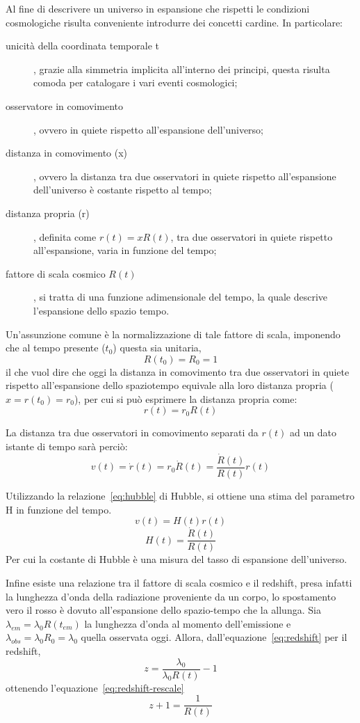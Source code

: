 Al fine di descrivere un universo in espansione che rispetti le condizioni cosmologiche risulta conveniente introdurre dei concetti cardine. In particolare:
\begin{description}
    \item[unicità della coordinata temporale t], grazie alla simmetria implicita all'interno dei principi, questa risulta comoda per catalogare i vari eventi cosmologici;
    \item[osservatore in comovimento], ovvero in quiete rispetto all'espansione dell'universo;
    \item[distanza in comovimento (x)], ovvero la distanza tra due osservatori in quiete rispetto all'espansione dell'universo è costante rispetto al tempo;
    \item[distanza propria (r)], definita come $r(t) = x R(t)$, tra due osservatori in quiete rispetto all'espansione, varia in funzione del tempo;
    \item[fattore di scala cosmico $R(t)$], si tratta di una funzione adimensionale del tempo, la quale descrive l'espansione dello spazio tempo.
\end{description}

Un'assunzione comune è la normalizzazione di tale fattore di scala, imponendo che al tempo presente ($t_0$) questa sia unitaria,
\[
    R(t_0) = R_0 = 1
\]
il che vuol dire che oggi la distanza in comovimento tra due osservatori in quiete rispetto all'espansione dello spaziotempo equivale alla loro distanza propria ($x = r(t_0) = r_0$), per cui si può esprimere la distanza propria come:
\[
    r(t)= r_0 R(t)
\]

La distanza tra due osservatori in comovimento separati da $r(t)$ ad un dato istante di tempo sarà perciò:
\begin{equation}\label{eq:hubble-speed}
    v(t) = \dot{r}(t) = r_0 \dot{R}(t) = \frac{\dot{R}(t)}{R(t)}r(t)
\end{equation}

Utilizzando la relazione~\ref{eq:hubble} di Hubble, si ottiene una stima del parametro H in funzione del tempo.
\[
    v(t) = H(t)r(t)
\]
\begin{equation}\label{eq:hubble-scale}
    H(t) = \frac{\dot{R}(t)}{R(t)}
\end{equation}
Per cui la costante di Hubble è una misura del tasso di espansione dell'universo.

Infine esiste una relazione tra il fattore di scala cosmico e il redshift, presa infatti la lunghezza d'onda della radiazione proveniente da un corpo, lo spostamento vero il rosso è dovuto all'espansione dello spazio-tempo che la allunga. Sia $\lambda_{em} = \lambda_0 R(t_{em})$ la lunghezza d'onda al momento dell'emissione e $\lambda_{obs} = \lambda_0 R_0 = \lambda_0$ quella osservata oggi. Allora, dall'equazione~\ref{eq:redshift} per il redshift,
\[
    z = \frac{\lambda_0}{\lambda_0 R(t)}-1
\]
ottenendo l'equazione~\ref{eq:redshift-rescale}
\begin{equation}\label{eq:redshift-rescale}
    z + 1 = \frac{1}{R(t)} 
\end{equation}